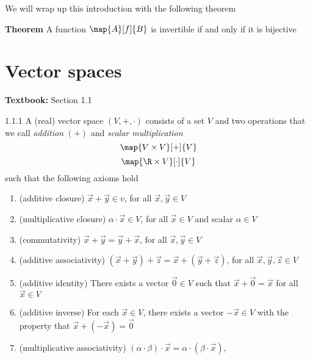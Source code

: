\documentclass[10pt]{article}
\begin{document}
\pr
We will wrap up this introduction with the following theorem

\lb
\textbf{Theorem}
\pr
A function $\map{A}[f]{B}$ is invertible if and only if it is bijective









\newpage
\section*{Vector spaces}%
\label{sec:vector spaces}
\pr
\textbf{Textbook:} Section 1.1



\begin{ddef}{1.1.1}
    A (real) vector space $(V, + , \cdot)$ consists of a set $V$ and two operations that we
    call \emph{addition} $(+)$ and \emph{scalar multiplication}
    \[ \map{V \times V}[+]{V} \]
    \[ \map{\R \times V}[\cdot]{V} \]
    such that the following axioms hold
    \begin{enumerate}
        \item
            (additive closure)
            \qquad $\vec x + \vec y ∈ v$,
            for all $\vec x, \vec y ∈ V$
        \item
            (multiplicative closure)
            \qquad $α \cdot \vec x ∈ V$,
            for all $\vec x ∈ V$ and scalar $α ∈ V$
        \item
            (commutativity)
            \qquad $\vec x + \vec y = \vec y + \vec x$,
            for all $\vec x, \vec y ∈ V$
        \item
            (additive associativity)
            \qquad $(\vec x + \vec y) + \vec z =\vec x + (\vec y + \vec z)$,
            for all $\vec x , \vec y , \vec z ∈ V$
        \item
            (additive identity)
            \qquad There exists a vector $\vec 0 ∈ V$ such that $\vec x + \vec 0 = \vec x$
            for all $\vec x ∈  V$
        \item
            (additive inverse)
            \qquad For each $\vec x ∈ V$, there exists a vector $- \vec x ∈ V$
            with the property that $\vec x + (- \vec x) = \vec 0$
        \item
            (multiplicative associativity)
            \qquad $(α \cdot β) \cdot \vec x = α \cdot ( β \cdot \vec x)$,

\end{enumerate}
\end{ddef}
\end{document}
